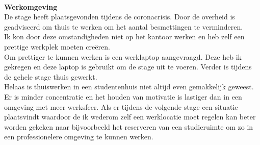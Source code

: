 \documentclass[12pt, letterpaper]{article}
\begin{document}
\begin{appendices}
\\
\textbf{Werkomgeving} \\
De stage heeft plaatsgevonden tijdens de coronacrisis. Door de overheid is geadviseerd om thuis te werken om het aantal besmettingen te verminderen. \\
Ik kon door deze omstandigheden niet op het kantoor werken en heb zelf een prettige werkplek moeten creëren.\\
Om prettiger te kunnen werken is een werklaptop aangevraagd. Deze heb ik gekregen en deze laptop is gebruikt om de stage uit te voeren. Verder is tijdens de gehele stage thuis gewerkt. \\
Helaas is thuiswerken in een studentenhuis niet altijd even gemakkelijk geweest. Er is minder concentratie en het houden van motivatie is lastiger dan in een omgeving met meer werksfeer. Als er tijdens de volgende stage een situatie plaatsvindt waardoor de ik wederom zelf een werklocatie moet regelen kan beter worden gekeken naar bijvoorbeeld het reserveren van een studieruimte om zo in een professionelere omgeving te kunnen werken. 


\end{appendices}
\end{document}
